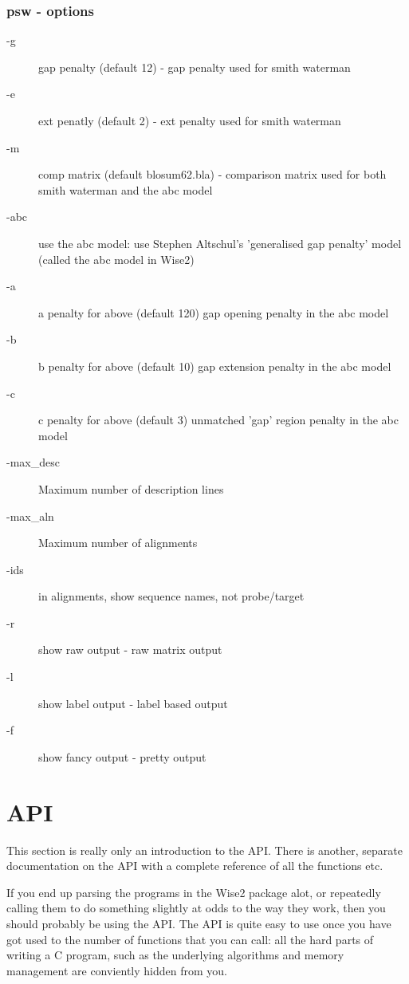 \documentclass{article}
\begin{document}
\subsubsection{psw - options}
\begin{description}
\item[-g] gap penalty (default 12) - gap penalty used for smith waterman
\item[-e] ext penatly (default 2) - ext penalty used for smith waterman
\item[-m] comp matrix (default blosum62.bla) - comparison matrix used for
both smith waterman and the abc model
\item[-abc] use the abc model: use Stephen Altschul's 'generalised gap penalty'
model (called the abc model in Wise2)
\item[-a]   a penalty for above (default 120) gap opening penalty in the abc model
\item[-b]   b penalty for above (default 10) gap extension penalty in the abc model
\item[-c]   c penalty for above (default 3) unmatched 'gap' region penalty in the abc model
\item[-max\_desc] Maximum number of description lines
\item[-max\_aln] Maximum number of alignments
\item[-ids] in alignments, show sequence names, not probe/target
\item[-r] show raw output - raw matrix output
\item[-l] show label output - label based output
\item[-f] show fancy output - pretty output
\end{description}

\section{API}
\label{sec:api}
This section is really only an introduction to the API. There is
another, separate documentation on the API with a complete reference
of all the functions etc.

If you end up parsing the programs in the Wise2 package alot, or repeatedly
calling them to do something slightly at odds to the way they work, then you
should probably be using the API. The API is quite easy to use once you have
got used to the number of functions that you can call: all the hard parts
of writing a C program, such as the underlying algorithms and memory management
are conviently hidden from you.
\end{document}
